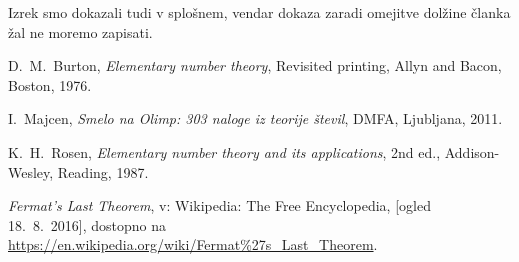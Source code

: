\documentclass[12pt, a4paper]{article}
\begin{document}
Izrek smo dokazali tudi v splošnem, vendar dokaza zaradi omejitve dolžine članka žal ne moremo zapisati.

\begin{thebibliography}{99}

D.~M.~Burton, \emph{Elementary number theory}, Revisited printing,  Allyn and Bacon, Boston, 1976.

\bibitem{}
I.~Majcen, \emph{Smelo na Olimp: 303 naloge iz teorije števil}, DMFA, Ljubljana, 2011.

\bibitem{}
K.~H.~Rosen, \emph{Elementary number theory and its applications}, 2nd ed.,  Addison-Wesley, Reading, 1987.

\emph{Fermat's Last Theorem}, v: Wikipedia: The Free Encyclopedia, [ogled 18.~8.~2016], dostopno na \url{https://en.wikipedia.org/wiki/Fermat%27s_Last_Theorem}.
\end{thebibliography}
\end{document}

